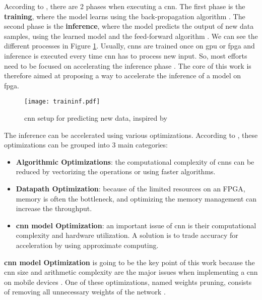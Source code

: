 According to \textcite{abdelouahab_accelerating_2018}, there are 2 phases when executing a \acrshort{cnn}. The first phase is the \textbf{training}, where the model learns using the back-propagation algorithm \cite{lecun_backpropagation_1989}. The second phase is the \textbf{inference}, where the model predicts the output of new data samples, using the learned model and the feed-forward algorithm \cite{zhang_optimizing_2015}. We can see the different processes in Figure \ref{fig:traininf}. Usually, \acrshort{cnn}s are trained once on \acrshort{gpu} or \acrshort{fpga} and inference is executed every time \acrshort{cnn} has to process new input. So, most efforts need to be focused on accelerating the inference phase \cite{abdelouahab_accelerating_2018}. The core of this work is therefore aimed at proposing a way to accelerate the inference of a model on \acrshort{fpga}.
%
\begin{figure}[H]
    \texttt{[image: traininf.pdf]}
    \caption{\acrshort{cnn} setup for predicting new data, inspired by \cite{nurvitadhi_can_2017}}
    \label{fig:traininf}
\end{figure}

The inference can be accelerated using various optimizations. According to \textcite{abdelouahab_accelerating_2018}, these optimizations can be grouped into 3 main categories:
\begin{itemize}
    \item \textbf{Algorithmic Optimizations}: the computational complexity of \acrshort{cnn}s can be reduced by vectorizing the operations or using faster algorithms.
    \item \textbf{Datapath Optimization}: because of the limited resources on an FPGA, memory is often the bottleneck, and optimizing the memory management can increase the throughput.
    \item \textbf{\acrshort{cnn} model Optimization}: an important issue of \acrshort{cnn} is their computational complexity and hardware utilization. A solution is to trade accuracy for acceleration by using approximate computing.
\end{itemize}

\textbf{\acrshort{cnn} model Optimization} is going to be the key point of this work because the \acrshort{cnn} size and arithmetic complexity are the major issues when implementing a \acrshort{cnn} on mobile devices \cite{cheng_recent_2018}. One of these optimizations, named weights pruning, consists of removing all unnecessary weights of the network \cite{abdelouahab_accelerating_2018}.

